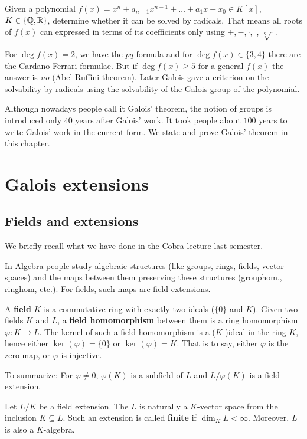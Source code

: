 \documentclass[twoside = false,	%
		headsepline,		%
		parskip = true,
		]{scrbook}						%
\begin{document}
    Given a polynomial $f(x) = x^n + a_{n-1}x^{n-1} + \dots + a_1x + x_0 \in K[x]$, $K \in \{\mathbb Q,\mathbb R\}$, determine whether it can be solved by radicals. That means all roots of $f(x)$ can expressed in terms of its coefficients only using $+,-,\cdot,$ \textdiv, $\sqrt[k]{\cdot}$.

    For $\deg f(x) = 2$, we have the $pq$-formula and for $\deg f(x) \in \{3,4\}$ there are the Cardano-Ferrari formulae. But if $\deg f(x) \geq 5$ for a general $f(x)$ the answer is \textit{no} (Abel-Ruffini theorem). Later Galois gave a criterion on the solvability by radicals using the solvability of the Galois group of the polynomial.
    
    Although nowadays people call it Galois' theorem, the notion of groups is introduced only 40 years after Galois' work. It took people about $100$ years to write Galois' work in the current form.
    We state and prove Galois' theorem in this chapter.
    
\section{Galois extensions}
    \subsection{Fields and extensions}
        We briefly recall what we have done in the Cobra lecture \cite{Cobra} last semester.
        
        In Algebra people study algebraic structures (like groups, rings, fields, vector spaces) and the maps between them preserving these structures (grouphom., ringhom, etc.). For fields, such maps are field extensions.
        
        A \textbf{field} $K$ is a commutative ring with exactly two ideals ($\{0\}$ and $K$).
        Given two fields $K$ and $L$, a \textbf{field homomorphism} between them is a ring homomorphism $\varphi: K \rightarrow L$. The kernel of such a field homomorphism is a ($K$-)ideal in the ring $K$, hence either $\ker(\varphi) = \{0\}$ or $\ker(\varphi) = K$. That is to say, either $\varphi$ is the zero map, or $\varphi$ is injective.
        
        To summarize: For $\varphi \neq 0$, $\varphi(K)$ is a subfield of $L$ and $L/\varphi(K)$ is a field extension.
        
        Let $L/K$ be a field extension. The $L$ is naturally a $K$-vector space from the inclusion $K \subseteq L$. Such an extension is called \textbf{finite} if $\dim_K L < \infty$. Moreover, $L$ is also a $K$-algebra.
        
\end{document}
